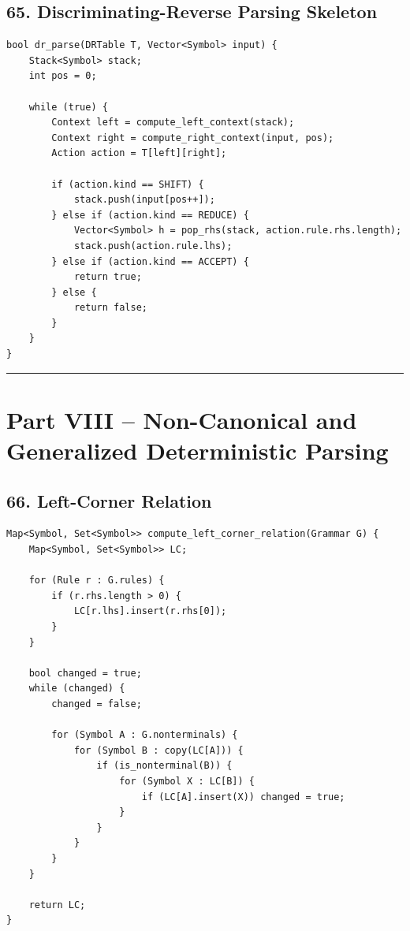 \documentclass[10pt,letterpaper]{article}
\begin{document}
\subsection*{65. Discriminating-Reverse Parsing Skeleton}

\begin{verbatim}
bool dr_parse(DRTable T, Vector<Symbol> input) {
    Stack<Symbol> stack;
    int pos = 0;

    while (true) {
        Context left = compute_left_context(stack);
        Context right = compute_right_context(input, pos);
        Action action = T[left][right];

        if (action.kind == SHIFT) {
            stack.push(input[pos++]);
        } else if (action.kind == REDUCE) {
            Vector<Symbol> h = pop_rhs(stack, action.rule.rhs.length);
            stack.push(action.rule.lhs);
        } else if (action.kind == ACCEPT) {
            return true;
        } else {
            return false;
        }
    }
}
\end{verbatim}

\medskip\hrule\medskip

\clearpage
\section*{Part VIII -- Non-Canonical and Generalized Deterministic Parsing}

\subsection*{66. Left-Corner Relation}

\begin{verbatim}
Map<Symbol, Set<Symbol>> compute_left_corner_relation(Grammar G) {
    Map<Symbol, Set<Symbol>> LC;

    for (Rule r : G.rules) {
        if (r.rhs.length > 0) {
            LC[r.lhs].insert(r.rhs[0]);
        }
    }

    bool changed = true;
    while (changed) {
        changed = false;

        for (Symbol A : G.nonterminals) {
            for (Symbol B : copy(LC[A])) {
                if (is_nonterminal(B)) {
                    for (Symbol X : LC[B]) {
                        if (LC[A].insert(X)) changed = true;
                    }
                }
            }
        }
    }

    return LC;
}
\end{verbatim}
\end{document}
